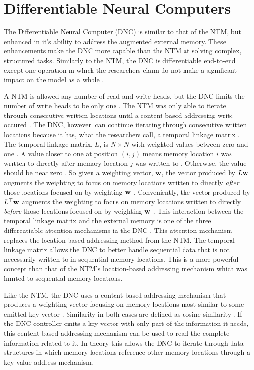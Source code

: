 \section{Differentiable Neural Computers}
The Differentiable Neural Computer (DNC) is similar to that of the NTM, but
enhanced in it's ability to address the augmented external memory. These
enhancements make the DNC more capable than the NTM at solving complex,
structured tasks. Similarly to the NTM, the DNC is differentiable end-to-end
except one operation in which the researchers claim do not make a significant
impact on the model as a whole \cite{graves2016hybrid}.

A NTM is allowed any number of read and write heads, but the DNC limits
the number of write heads to be only one \cite{graves2016hybrid}. The NTM
was only able to iterate through consecutive written locations until a
content-based addressing write occured \cite{graves2016hybrid}. The DNC,
however, can continue iterating through consecutive written locations because
it has, what the researchers call, a temporal linkage matrix
\cite{graves2016hybrid}. The temporal linkage matrix, $L$, is $N \times N$ with
weighted values between zero and one \cite{graves2016hybrid}. A value closer
to one at position $(i, j)$ means memory location $i$ was written to directly
after memory location $j$ was written to \cite{graves2016hybrid}. Otherwise,
the value should be near zero \cite{graves2016hybrid}. So given a weighting
vector, $\bf{w}$, the vector produced by $L\bf{w}$ augments the weighting to
focus on memory locations written to directly \textit{after} those
locations focused on by weighting $\bf{w}$ \cite{graves2016hybrid}.
Conveniently, the vector produced by $L^\top \bf{w}$ augments the weighting to
focus on memory locations written to directly \textit{before} those
locations focused on by weighting $\bf{w}$ \cite{graves2016hybrid}. This
interaction between the temporal linkage matrix and the external memory is one
of the three differentiable attention mechanisms in the DNC
\cite{graves2016hybrid}. This attention mechanism replaces the location-based
addressing method from the NTM. The temporal linkage matrix allows the DNC to
better handle sequential data that is not necessarily written to in sequential
memory locations. This is a more powerful concept than that of the NTM's
location-based addressing mechanism which was limited to sequential
memory locations.

Like the NTM, the DNC uses a content-based addressing mechanism that produces
a weighting vector focusing on memory locations most similar to some
emitted key vector \cite{graves2016hybrid}. Similarity in both cases are
defined as cosine similarity
\cite{DBLP:journals/corr/GravesWD14,graves2016hybrid}. If the DNC controller
emits a key vector with only part of the information it needs, this
content-based addressing mechanism can be used to read the complete
information related to it. In theory this allows the DNC to iterate
through data structures in which memory locations reference other memory
locations through a key-value address mechanism.

